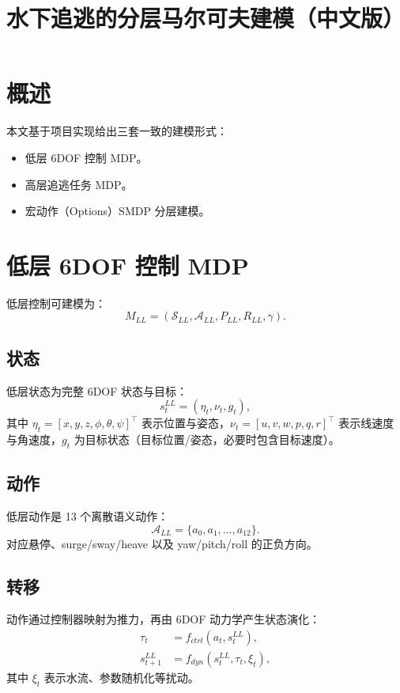 \documentclass[11pt]{article}
\title{水下追逃的分层马尔可夫建模（中文版）}
\author{}
\date{}
\begin{document}
\maketitle

\section{概述}
本文基于项目实现给出三套一致的建模形式：
\begin{itemize}
  \item 低层 6DOF 控制 MDP。
  \item 高层追逃任务 MDP。
  \item 宏动作（Options）SMDP 分层建模。
\end{itemize}

\section{低层 6DOF 控制 MDP}
低层控制可建模为：
\begin{equation}
M_{LL} = (\mathcal{S}_{LL}, \mathcal{A}_{LL}, P_{LL}, R_{LL}, \gamma).
\end{equation}

\subsection*{状态}
低层状态为完整 6DOF 状态与目标：
\begin{equation}
 s_t^{LL} = (\eta_t, \nu_t, g_t),
\end{equation}
其中 $\eta_t = [x, y, z, \phi, \theta, \psi]^\top$ 表示位置与姿态，$\nu_t = [u, v, w, p, q, r]^\top$ 表示线速度与角速度，$g_t$ 为目标状态（目标位置/姿态，必要时包含目标速度）。

\subsection*{动作}
低层动作是 13 个离散语义动作：
\begin{equation}
\mathcal{A}_{LL} = \{a_0, a_1, \ldots, a_{12}\}.
\end{equation}
对应悬停、surge/sway/heave 以及 yaw/pitch/roll 的正负方向。

\subsection*{转移}
动作通过控制器映射为推力，再由 6DOF 动力学产生状态演化：
\begin{align}
\tau_t &= f_{ctrl}(a_t, s_t^{LL}), \\
 s_{t+1}^{LL} &= f_{dyn}(s_t^{LL}, \tau_t, \xi_t),
\end{align}
其中 $\xi_t$ 表示水流、参数随机化等扰动。
\end{document}
